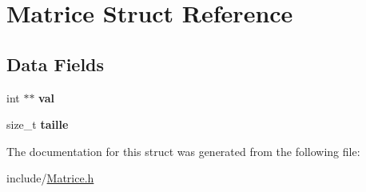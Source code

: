 \hypertarget{struct_matrice}{\section{Matrice Struct Reference}
\label{struct_matrice}
}
\subsection*{Data Fields}
\begin{DoxyCompactItemize}
\item 
\hypertarget{struct_matrice_acc6b9a7227e9dc9917faf87587be85ce}{int $\ast$$\ast$ {\bfseries val}}\label{struct_matrice_acc6b9a7227e9dc9917faf87587be85ce}

\item 
\hypertarget{struct_matrice_a930939cf52b73e1f58c2ecac08d10ffd}{size\+\_\+t {\bfseries taille}}\label{struct_matrice_a930939cf52b73e1f58c2ecac08d10ffd}

\end{DoxyCompactItemize}


The documentation for this struct was generated from the following file\+:\begin{DoxyCompactItemize}
\item 
include/\hyperlink{_matrice_8h}{Matrice.\+h}\end{DoxyCompactItemize}
